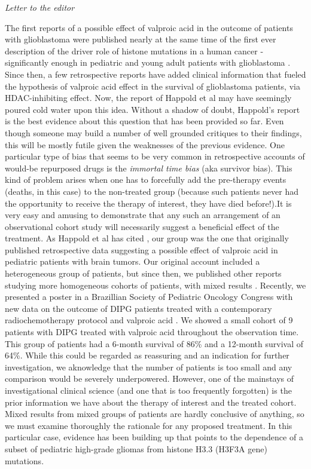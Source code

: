 \textit{Letter to the editor} 

The first reports \cite{Happold_2016} of a possible effect of valproic acid in the outcome of patients with glioblastoma were published nearly at the same time of the first ever description of the driver role of histone mutations in a human cancer - significantly enough in pediatric and young adult patients with glioblastoma \cite{Schwartzentruber_2012}. Since then, a few retrospective reports have added clinical information that fueled the hypothesis of valproic acid effect in the survival of glioblastoma patients, via HDAC-inhibiting effect. Now, the report of Happold et al \cite{Happold_2016} may have seemingly poured cold water upon this idea. Without a shadow of doubt, Happold's report is the best evidence about this question that has been provided so far. Even though someone may build a number of well grounded critiques to their findings, this will be mostly futile given the weaknesses of the previous evidence. One particular type of bias that seems to be very common in retrospective accounts of would-be repurposed drugs is the \textit{immortal time bias} \cite{Ho_2012} (aka survivor bias). This kind of problem arises when one has to forcefully add the pre-therapy events (deaths, in this case) to the non-treated group (because such patients never had the opportunity to receive the therapy of interest, they have died before!).It is very easy and amusing to demonstrate that any such an arrangement of an observational cohort study will necessarily suggest a beneficial effect of the treatment. As Happold et al has cited \cite{Happold_2016}, our group was the one that originally published retrospective data suggesting a possible effect of valproic acid in pediatric patients with brain tumors. Our original account included a heterogeneous group of patients, but since then, we published other reports studying more homogeneous cohorts of patients, with mixed results \cite{Felix_2012}. Recently, we presented a poster in a Brazillian Society of Pediatric Oncology Congress with new data on the outcome of DIPG patients treated with a contemporary radiochemotherapy protocol and valproic acid \cite{59c42273-d778-4fe5-8019-07a0e4509517}. We showed a small cohort of 9 patients with DIPG treated with valproic acid throughout the observation time. This group of patients had a 6-month survival of 86\% and a 12-month survival of 64\%. While this could be regarded as reassuring and an indication for further investigation, we aknowledge that the number of patients is too small and any comparison would be severely underpowered. However, one of the mainstays of investigational clinical science (and one that is too frequently forgotten) is the prior information we have about the therapy of interest and the treated cohort. Mixed results from mixed groups of patients are hardly conclusive of anything, so we must examine thoroughly the rationale for any proposed treatment. In this particular case, evidence has been building up that points to the dependence of a subset of pediatric high-grade gliomas from histone H3.3 (H3F3A gene) mutations.